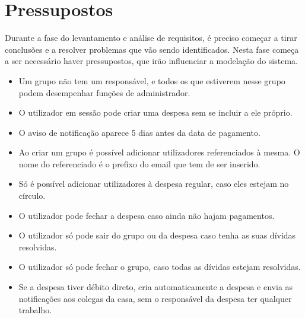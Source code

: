 \section{Pressupostos}

Durante a fase do levantamento e análise de requisitos, é preciso começar a tirar conclusões e a resolver problemas que vão sendo identificados. Nesta fase começa a ser necessário haver pressupostos, que irão influenciar a modelação do sistema.

\begin{itemize}
\item Um grupo não tem um responsável, e todos os que estiverem nesse grupo podem desempenhar funções de administrador.
\item O utilizador em sessão pode criar uma despesa sem se incluir a ele próprio.
\item O aviso de notificação aparece 5 dias antes da data de pagamento.
\item Ao criar um grupo é possível adicionar utilizadores referenciados à mesma. O nome do referenciado é o prefixo do email que tem de ser inserido.
\item Só é possível adicionar utilizadores à despesa regular, caso eles estejam no círculo.
\item O utilizador pode fechar a despesa caso ainda não hajam pagamentos.
\item O utilizador só pode sair do grupo ou da despesa caso tenha as suas dívidas resolvidas.
\item O utilizador só pode fechar o grupo, caso todas as dívidas estejam resolvidas.
\item Se a despesa tiver débito direto, cria automaticamente a despesa e envia as notificações aos colegas da casa, sem o responsável da despesa ter qualquer trabalho.
\end{itemize}